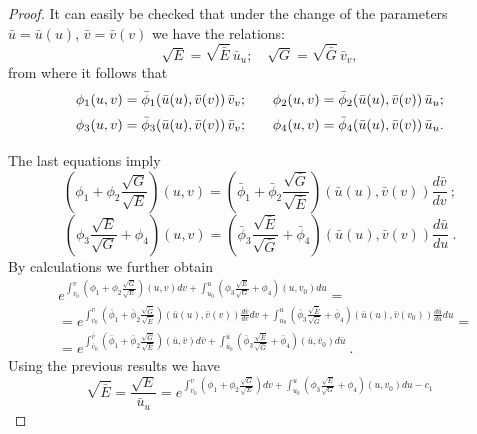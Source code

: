 \documentclass[12pt]{amsart}
\theoremstyle{definition}
\theoremstyle{remark}
\newcommand{\ds}{\displaystyle}
\numberwithin{equation}{section}
\begin{document}
\begin{proof}
	
	It can easily be checked that  under the change of the parameters $\bar u=\bar u(u)$, $\bar v= \bar v(v) $ we have the relations:
	$$\sqrt {E} = \sqrt {\bar E} \, {\bar u}_u; \quad \sqrt {G} = \sqrt {\bar G} \, {\bar v}_v,$$
	from where it follows that
	\begin{equation*} 
		\begin{array}{ll} 
			\vspace{2mm}
			\phi_1 (u,v) = {\bar \phi_1} (\bar u(u),\bar v(v)) \, {\bar v}_v;  & \quad \phi_2 (u,v) = {\bar \phi_2} (\bar u(u),\bar v(v)) \, {\bar u}_u;  \\
			\vspace{2mm}
			\phi_3 (u,v) = {\bar \phi_3} (\bar u(u),\bar v(v)) \, {\bar v}_v;  & \quad \phi_4 (u,v) = {\bar \phi_4} (\bar u(u),\bar v(v)) \, {\bar u}_u.
		\end{array}   
	\end{equation*}
The last equations imply 
	$$
	\ds (\phi_1+\phi_2\frac{\sqrt {G}}{\sqrt {E}})(u,v)=(\bar \phi_1+\bar \phi_2\frac{\sqrt {\bar G}}{\sqrt {\bar E}})(\bar u(u),\bar v(v))\frac{d\bar v}{dv} \ ;
	$$
	$$
	\ds (\phi_3\frac{\sqrt {E}}{\sqrt {G}}+\phi_4)(u,v)=(\bar \phi_3\frac{\sqrt {\bar E}}{\sqrt {\bar G}}+\bar \phi_4)(\bar u(u),\bar v(v))\frac{d\bar u}{du} \ .
	$$
By calculations we further obtain
	\begin{equation}\label{eq:3.6}
		\begin{split}
			& e^{\ds\int_{v_0}^v\left(\phi_1+\phi_2\frac{\sqrt G}{\sqrt E}\right)(u,v)dv
				+\int_{u_0}^u\left(\phi_3\frac{\sqrt {E}}{\sqrt {G}}+\phi_4\right)(u,v_0)du} = \\
			& =e^{\ds\int_{v_0}^v\left(\bar \phi_1+\bar \phi_2\frac{\sqrt {\bar G}}{\sqrt {\bar E}}\right)(\bar u(u),\bar v(v))\frac{d\bar v}{dv}{dv}
				+\int_{u_0}^u\left(\bar \phi_3\frac{\sqrt {\bar E}}{\sqrt {\bar G}}+\bar \phi_4\right)(\bar u(u),\bar v(v_0))\frac{d\bar u}{du}du} = \\
			& =e^{\ds\int_{\bar v_0}^{\bar v}\left(\bar \phi_1+\bar \phi_2\frac{\sqrt {\bar G}}{\sqrt {\bar E}}\right)(\bar u,\bar v)d\bar v
				+\int_{\bar u_0}^{\bar u}\left(\bar \phi_3\frac{\sqrt {\bar E}}{\sqrt {\bar G}}+\bar \phi_4\right)(\bar u,\bar v_0)d\bar u} \ .
		\end{split}
	\end{equation}
		Using the previous results we have
	$$
	\sqrt{\bar E}=\frac{\sqrt{E}}{\bar u_u}=e^{\ds\int_{v_0}^v\left(\phi_1+\phi_2\frac{\sqrt G}{\sqrt E}\right)dv
		+\int_{u_0}^u\left(\phi_3\frac{\sqrt {E}}{\sqrt {G}}+\phi_4\right)(u,v_0)du-c_1}
	$$
	

\end{proof}
\end{document}
